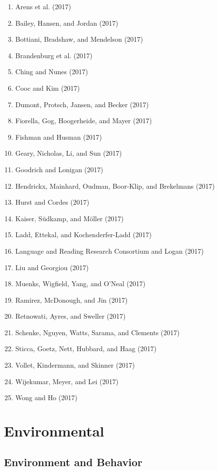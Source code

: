 \documentclass[english,man]{apa6}
\providecommand{\tightlist}{%
  \setlength{\itemsep}{0pt}\setlength{\parskip}{0pt}}
\theoremstyle{definition}
\theoremstyle{definition}
\theoremstyle{definition}
\theoremstyle{remark}
\begin{document}
\begin{enumerate}
\def\labelenumi{\arabic{enumi})}
\tightlist
\item
  Arens et al. (2017)
\item
  Bailey, Hansen, and Jordan (2017)
\item
  Bottiani, Bradshaw, and Mendelson (2017)
\item
  Brandenburg et al. (2017)
\item
  Ching and Nunes (2017)
\item
  Cooc and Kim (2017)
\item
  Dumont, Protsch, Jansen, and Becker (2017)
\item
  Fiorella, Gog, Hoogerheide, and Mayer (2017)
\item
  Fishman and Husman (2017)
\item
  Geary, Nicholas, Li, and Sun (2017)
\item
  Goodrich and Lonigan (2017)
\item
  Hendrickx, Mainhard, Oudman, Boor-Klip, and Brekelmans (2017)
\item
  Hurst and Cordes (2017)
\item
  Kaiser, Südkamp, and Möller (2017)
\item
  Ladd, Ettekal, and Kochenderfer-Ladd (2017)
\item
  Language and Reading Research Consortium and Logan (2017)
\item
  Liu and Georgiou (2017)
\item
  Muenks, Wigfield, Yang, and O'Neal (2017)
\item
  Ramirez, McDonough, and Jin (2017)
\item
  Retnowati, Ayres, and Sweller (2017)
\item
  Schenke, Nguyen, Watts, Sarama, and Clements (2017)
\item
  Sticca, Goetz, Nett, Hubbard, and Haag (2017)
\item
  Vollet, Kindermann, and Skinner (2017)
\item
  Wijekumar, Meyer, and Lei (2017)
\item
  Wong and Ho (2017)
\end{enumerate}

\section{Environmental}\label{environmental}

\subsection{Environment and Behavior}\label{environment-and-behavior}
\end{document}
